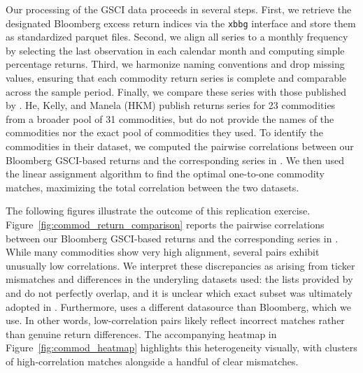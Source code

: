 \documentclass{article}
\begin{document}
\begin{appendices}
Our processing of the GSCI data proceeds in several steps. First, we retrieve the 
designated Bloomberg excess return indices via the \texttt{xbbg} interface and 
store them as standardized parquet files. Second, we align all series to a 
monthly frequency by selecting the last observation in each calendar month and 
computing simple percentage returns. Third, we harmonize naming conventions and 
drop missing values, ensuring that each commodity return series is complete and 
comparable across the sample period. Finally, we compare these series
with those published by \cite{He2017}. He, Kelly, and Manela (HKM) publish returns series for 23 commodities from a broader pool of 31 commodities, but do not provide the names of the commodities nor the exact pool of commodities they used. To identify the commodities in their dataset, we computed the pairwise correlations between our Bloomberg GSCI-based returns and the corresponding series in \cite{He2017}. We then used the linear assignment algorithm to find the optimal one-to-one commodity matches, maximizing the total correlation between the two datasets.

The following figures illustrate the outcome of this replication exercise. 
Figure~\ref{fig:commod_return_comparison} reports the pairwise correlations between our 
Bloomberg GSCI-based returns and the corresponding series in \cite{He2017}. 
While many commodities show very high alignment, several pairs exhibit unusually 
low correlations. We interpret these discrepancies as arising from ticker 
mismatches and differences in the underyling datasets used: the lists provided by \cite{Koijen2018} and \cite{Yang2013} do not 
perfectly overlap, and it is unclear which exact subset was ultimately adopted 
in \cite{He2017}. Furthermore, \cite{He2017} uses a different datasource than
Bloomberg, which we use.
In other words, low-correlation pairs likely reflect incorrect 
matches rather than genuine return differences. The accompanying heatmap in 
Figure~\ref{fig:commod_heatmap} highlights this heterogeneity visually, with 
clusters of high-correlation matches alongside a handful of clear mismatches.


\end{appendices}
\end{document}
